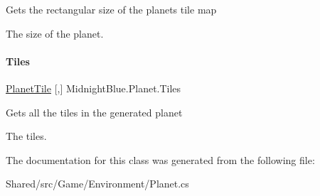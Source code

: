 Gets the rectangular size of the planets tile map 

The size of the planet.\hypertarget{class_midnight_blue_1_1_planet_a3e78bf28456cdfd2576b68e3ef106fc7}{}\label{class_midnight_blue_1_1_planet_a3e78bf28456cdfd2576b68e3ef106fc7} 
\paragraph{\texorpdfstring{Tiles}{Tiles}}
{\footnotesize\ttfamily \hyperlink{class_midnight_blue_1_1_planet_tile}{Planet\+Tile} \mbox{[},\mbox{]} Midnight\+Blue.\+Planet.\+Tiles\hspace{0.3cm}{\ttfamily [get]}}



Gets all the tiles in the generated planet 

The tiles.

The documentation for this class was generated from the following file\+:\begin{DoxyCompactItemize}
\item 
Shared/src/\+Game/\+Environment/Planet.\+cs\end{DoxyCompactItemize}
